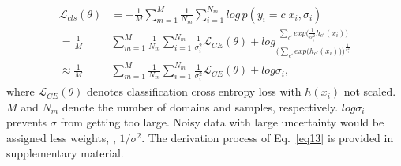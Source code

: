 \documentclass[10pt,twocolumn,letterpaper]{article}
\begin{document}
{\small \begin{equation}
		\label{eq13}
		\begin{split}
			\mathcal{L}_{cls}(\theta)&=-\frac{1}{M}\sum_{m=1}^{M}\frac{1}{N_m}\sum_{i=1}^{N_m}log\,p(y_i=c|x_i,\sigma_i)\\
			=\frac{1}{M}&\sum_{m=1}^{M}\frac{1}{N_m}\sum_{i=1}^{N_m}\frac{1}{\sigma_i^2}\mathcal{L}_{CE}(\theta)+log\frac{\sum_{c'}exp\bigl(\frac{1}{\sigma_i^2}h_{c'}(x_i)\bigr) }{\bigl(\sum_{c'}exp\bigl(h_{c'}(x_i)\bigr)  \bigr)^\frac{1}{\sigma_i^2}}\\
			\approx \frac{1}{M}&\sum_{m=1}^{M}\frac{1}{N_m}\sum_{i=1}^{N_m}\frac{1}{\sigma_i^2}\mathcal{L}_{CE}(\theta)+log\sigma_i,
		\end{split}
\end{equation}}where $\mathcal{L}_{CE}(\theta)$ denotes classification cross entropy loss with $h(x_i)$ not scaled. $M$ and $N_m$ denote the number of domains and samples, respectively. $log\sigma_i$ prevents $\sigma$ from getting too large. Noisy data with large uncertainty would be assigned less weights, \ie, ${1}/{\sigma^2}$. The derivation process of Eq.~\ref{eq13} is provided in supplementary material.\\
\end{document}
